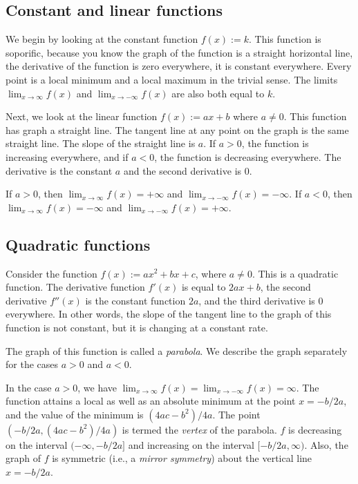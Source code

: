 \documentclass[10pt]{amsart}
\begin{document}
\subsection{Constant and linear functions}

We begin by looking at the constant function $f(x) := k$. This
function is soporific, because you know the graph of the function is a
straight horizontal line, the derivative of the function is zero
everywhere, it is constant everywhere. Every point is a local minimum
and a local maximum in the trivial sense. The limits $\lim_{x \to
\infty} f(x)$ and $\lim_{x \to -\infty} f(x)$ are also both equal to $k$.

Next, we look at the linear function $f(x) := ax + b$ where $a \ne
0$. This function has graph a straight line. The tangent line at any
point on the graph is the same straight line. The slope of the
straight line is $a$. If $a > 0$, the function is increasing
everywhere, and if $a < 0$, the function is decreasing everywhere. The
derivative is the constant $a$ and the second derivative is $0$.

If $a > 0$, then $\lim_{x \to \infty} f(x) = +\infty$ and $\lim_{x \to
  -\infty} f(x) = -\infty$. If $a < 0$, then $\lim_{x \to \infty} f(x)
= -\infty$ and $\lim_{x \to -\infty} f(x) = +\infty$.

\subsection{Quadratic functions}

Consider the function $f(x) := ax^2 + bx + c$, where $a \ne 0$. This
is a quadratic function. The derivative function $f'(x)$ is equal to
$2ax + b$, the second derivative $f''(x)$ is the constant function
$2a$, and the third derivative is $0$ everywhere. In other words, the
slope of the tangent line to the graph of this function is not
constant, but it is changing at a constant rate.

The graph of this function is called a {\em parabola}. We describe the
graph separately for the cases $a > 0$ and $a < 0$.

In the case $a > 0$, we have $\lim_{x \to \infty} f(x) = \lim_{x \to
  -\infty} f(x) = \infty$. The function attains a local as well as an
absolute minimum at the point $x = -b/2a$, and the value of the
minimum is $(4ac - b^2)/4a$. The point $(-b/2a,(4ac - b^2)/4a)$ is
termed the {\em vertex} of the parabola. $f$ is decreasing on the
interval $(-\infty,-b/2a]$ and increasing on the interval
  $[-b/2a,\infty)$. Also, the graph of $f$ is symmetric (i.e., a {\em
      mirror symmetry}) about the vertical line $x = -b/2a$.
\end{document}
